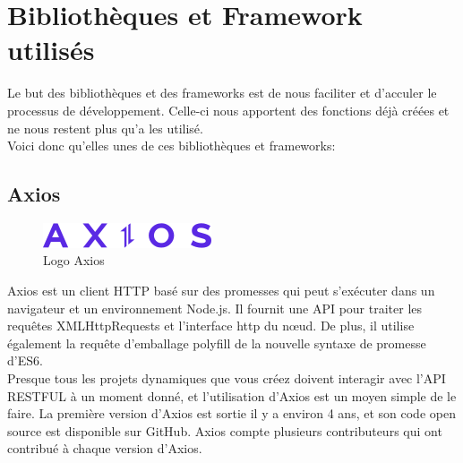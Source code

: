 \section{Bibliothèques et Framework utilisés}
    Le but des bibliothèques et des frameworks est de nous faciliter et d'acculer le processus de développement. Celle-ci nous apportent des fonctions déjà créées et ne nous restent plus qu'a les utilisé.\\

    Voici donc qu'elles unes de ces bibliothèques et frameworks:\\

    \subsection{Axios}
    \begin{figure}[H]
        \centering
        \includegraphics[scale=1]{ACR/axios-logo.png}
        \caption{Logo Axios}
    \end{figure}

    Axios\cite{axios} est un client HTTP basé sur des promesses qui peut s'exécuter dans un navigateur et un environnement Node.js. Il fournit une API pour traiter les requêtes XMLHttpRequests et l'interface http du nœud. De plus, il utilise également la requête d'emballage polyfill de la nouvelle syntaxe de promesse d'ES6.\\
    
    Presque tous les projets dynamiques que vous créez doivent interagir avec l'API RESTFUL à un moment donné, et l'utilisation d'Axios est un moyen simple de le faire. La première version d'Axios est sortie il y a environ 4 ans, et son code open source est disponible sur GitHub. Axios compte plusieurs contributeurs qui ont contribué à chaque version d'Axios.\\

